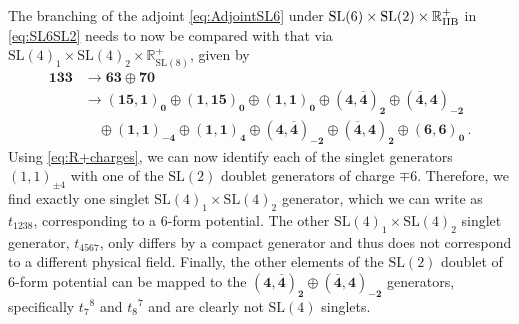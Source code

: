 \documentclass[a4paper, 11pt]{article}
\numberwithin{equation}{section}
\newcommand{\SL}[1]{\mathrm{SL}( #1 )}
\newcommand{\+}{\oplus}
\begin{document}
The branching of the adjoint \eqref{eq:AdjointSL6} under $\SL{6} \times \SL{2} \times \mathbb{R}^+_{\rm IIB}$ in \eqref{eq:SL6SL2} needs to now be compared with that via $\SL{4}_1 \times \SL{4}_2 \times \mathbb{R}^+_{\SL{8}}$, given by
\begin{equation}
	\begin{split}
		\mathbf{133} &\rightarrow \mathbf{63} \oplus \mathbf{70} \\
		&\rightarrow \mathbf{\left(15,1\right)_0} \oplus \mathbf{\left(1,15\right)_0} \oplus \mathbf{\left(1,1\right)_0} \oplus \mathbf{\left(4,\overline{4}\right)_2} \oplus \mathbf{\left(\overline{4},4\right)_{-2}} \\
		& \quad \oplus \mathbf{\left(1,1\right)_{-4}} \oplus \mathbf{\left(1,1\right)_{4}} \oplus \mathbf{\left(4,\overline{4}\right)_{-2}} \oplus \mathbf{\left(\overline{4},4\right)_{2}} \oplus \mathbf{\left(6,6\right)_0} \,.
	\end{split}
\end{equation}
Using \eqref{eq:R+charges}, we can now identify each of the singlet generators $\left(1,1\right)_{\pm4}$ with one of the $\SL{2}$ doublet generators of charge $\mp 6$. Therefore, we find exactly one singlet $\SL{4}_1 \times \SL{4}_2$ generator, which we can write as $t_{1238}$, corresponding to a 6-form potential. The other $\SL{4}_1 \times \SL{4}_2$ singlet generator, $t_{4567}$, only differs by a compact generator and thus does not correspond to a different physical field. Finally, the other elements of the $\SL{2}$ doublet of 6-form potential can be mapped to the $\mathbf{\left(4,\overline{4}\right)_{2}} \oplus \mathbf{\left(\overline{4},4\right)_{-2}}$ generators, specifically $t_7{}^8$ and $t_8{}^7$ and are clearly not $\SL{4}$ singlets.
\end{document}
